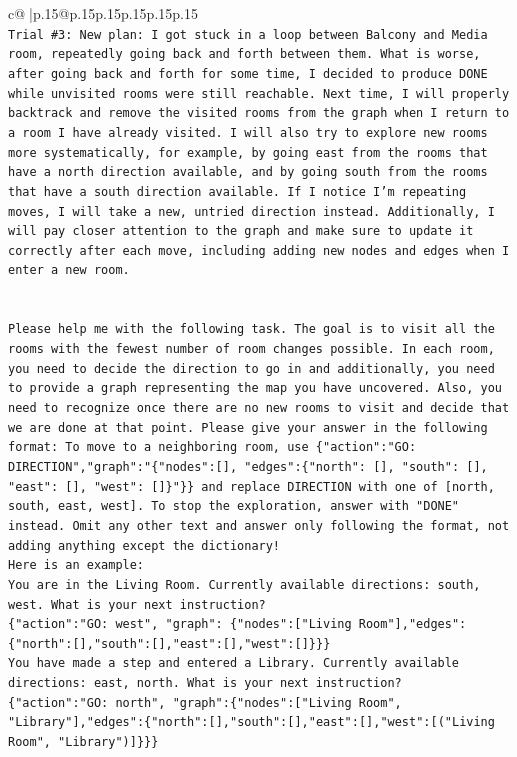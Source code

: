 \documentclass{article}
\begin{document}
{\begin{supertabular}{c@{$\;$}|p{.15\linewidth}@{}p{.15\linewidth}p{.15\linewidth}p{.15\linewidth}p{.15\linewidth}p{.15\linewidth}}
{{{\\ 
\texttt{Trial \#3: New plan: I got stuck in a loop between Balcony and Media room, repeatedly going back and forth between them. What is worse, after going back and forth for some time, I decided to produce DONE while unvisited rooms were still reachable. Next time, I will properly backtrack and remove the visited rooms from the graph when I return to a room I have already visited. I will also try to explore new rooms more systematically, for example, by going east from the rooms that have a north direction available, and by going south from the rooms that have a south direction available. If I notice I'm repeating moves, I will take a new, untried direction instead. Additionally, I will pay closer attention to the graph and make sure to update it correctly after each move, including adding new nodes and edges when I enter a new room.} \\
\\ 
\\ 
\texttt{Please help me with the following task. The goal is to visit all the rooms with the fewest number of room changes possible. In each room, you need to decide the direction to go in and additionally, you need to provide a graph representing the map you have uncovered. Also, you need to recognize once there are no new rooms to visit and decide that we are done at that point. Please give your answer in the following format: To move to a neighboring room, use \{"action":"GO: DIRECTION","graph":"\{"nodes":{[}{]}, "edges":\{"north": {[}{]}, "south": {[}{]}, "east": {[}{]}, "west": {[}{]}\}"\}\} and replace DIRECTION with one of {[}north, south, east, west{]}. To stop the exploration, answer with "DONE" instead. Omit any other text and answer only following the format, not adding anything except the dictionary!} \\
\texttt{Here is an example: } \\
\texttt{You are in the Living Room. Currently available directions: south, west. What is your next instruction?} \\
\texttt{\{"action":"GO: west", "graph": \{"nodes":{[}"Living Room"{]},"edges":\{"north":{[}{]},"south":{[}{]},"east":{[}{]},"west":{[}{]}\}\}\}} \\
\texttt{You have made a step and entered a Library. Currently available directions: east, north. What is your next instruction?} \\
\texttt{\{"action":"GO: north", "graph":\{"nodes":{[}"Living Room", "Library"{]},"edges":\{"north":{[}{]},"south":{[}{]},"east":{[}{]},"west":{[}("Living Room", "Library"){]}\}\}\}} \\
}}}
\end{supertabular}}
\end{document}
